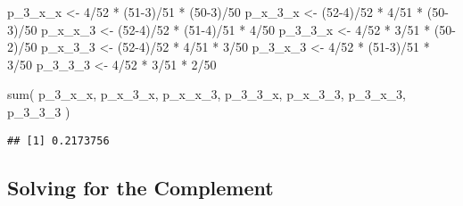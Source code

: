 \documentclass[
]{article}
\newenvironment{Shaded}{\begin{snugshade}}{\end{snugshade}}
\newcommand{\DecValTok}[1]{\textcolor[rgb]{0.00,0.00,0.81}{#1}}
\newcommand{\FunctionTok}[1]{\textcolor[rgb]{0.00,0.00,0.00}{#1}}
\newcommand{\NormalTok}[1]{#1}
\newcommand{\OtherTok}[1]{\textcolor[rgb]{0.56,0.35,0.01}{#1}}
\newcommand{\SpecialCharTok}[1]{\textcolor[rgb]{0.00,0.00,0.00}{#1}}
\begin{document}
\begin{Shaded}
\begin{Highlighting}[]
\NormalTok{p\_3\_x\_x }\OtherTok{\textless{}{-}} \DecValTok{4}\SpecialCharTok{/}\DecValTok{52} \SpecialCharTok{*}\NormalTok{ (}\DecValTok{51{-}3}\NormalTok{)}\SpecialCharTok{/}\DecValTok{51} \SpecialCharTok{*}\NormalTok{ (}\DecValTok{50{-}3}\NormalTok{)}\SpecialCharTok{/}\DecValTok{50}
\NormalTok{p\_x\_3\_x }\OtherTok{\textless{}{-}}\NormalTok{ (}\DecValTok{52{-}4}\NormalTok{)}\SpecialCharTok{/}\DecValTok{52} \SpecialCharTok{*} \DecValTok{4}\SpecialCharTok{/}\DecValTok{51} \SpecialCharTok{*}\NormalTok{ (}\DecValTok{50{-}3}\NormalTok{)}\SpecialCharTok{/}\DecValTok{50}
\NormalTok{p\_x\_x\_3 }\OtherTok{\textless{}{-}}\NormalTok{ (}\DecValTok{52{-}4}\NormalTok{)}\SpecialCharTok{/}\DecValTok{52} \SpecialCharTok{*}\NormalTok{ (}\DecValTok{51{-}4}\NormalTok{)}\SpecialCharTok{/}\DecValTok{51} \SpecialCharTok{*} \DecValTok{4}\SpecialCharTok{/}\DecValTok{50}
\NormalTok{p\_3\_3\_x }\OtherTok{\textless{}{-}} \DecValTok{4}\SpecialCharTok{/}\DecValTok{52} \SpecialCharTok{*} \DecValTok{3}\SpecialCharTok{/}\DecValTok{51} \SpecialCharTok{*}\NormalTok{ (}\DecValTok{50{-}2}\NormalTok{)}\SpecialCharTok{/}\DecValTok{50}
\NormalTok{p\_x\_3\_3 }\OtherTok{\textless{}{-}}\NormalTok{ (}\DecValTok{52{-}4}\NormalTok{)}\SpecialCharTok{/}\DecValTok{52} \SpecialCharTok{*} \DecValTok{4}\SpecialCharTok{/}\DecValTok{51} \SpecialCharTok{*} \DecValTok{3}\SpecialCharTok{/}\DecValTok{50}
\NormalTok{p\_3\_x\_3 }\OtherTok{\textless{}{-}} \DecValTok{4}\SpecialCharTok{/}\DecValTok{52} \SpecialCharTok{*}\NormalTok{ (}\DecValTok{51{-}3}\NormalTok{)}\SpecialCharTok{/}\DecValTok{51} \SpecialCharTok{*} \DecValTok{3}\SpecialCharTok{/}\DecValTok{50}
\NormalTok{p\_3\_3\_3 }\OtherTok{\textless{}{-}} \DecValTok{4}\SpecialCharTok{/}\DecValTok{52} \SpecialCharTok{*} \DecValTok{3}\SpecialCharTok{/}\DecValTok{51} \SpecialCharTok{*} \DecValTok{2}\SpecialCharTok{/}\DecValTok{50}

\FunctionTok{sum}\NormalTok{(}
\NormalTok{  p\_3\_x\_x,}
\NormalTok{  p\_x\_3\_x,}
\NormalTok{  p\_x\_x\_3,}
\NormalTok{  p\_3\_3\_x,}
\NormalTok{  p\_x\_3\_3,}
\NormalTok{  p\_3\_x\_3,}
\NormalTok{  p\_3\_3\_3}
\NormalTok{)}
\end{Highlighting}
\end{Shaded}

\begin{verbatim}
## [1] 0.2173756
\end{verbatim}

\hypertarget{solving-for-the-complement}{%
\subsection{Solving for the
Complement}\label{solving-for-the-complement}}
\end{document}
